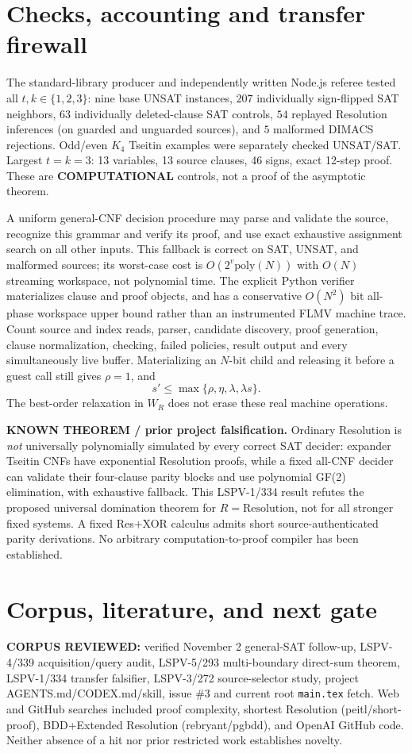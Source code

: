 \documentclass[11pt]{article}
\begin{document}
\section{Checks, accounting and transfer firewall}
The standard-library producer and independently written Node.js referee tested all $t,k\in\{1,2,3\}$: nine base UNSAT instances, $207$ individually sign-flipped SAT neighbors, $63$ individually deleted-clause SAT controls, $54$ replayed Resolution inferences (on guarded and unguarded sources), and $5$ malformed DIMACS rejections. Odd/even $K_4$ Tseitin examples were separately checked UNSAT/SAT. Largest $t=k=3$: 13 variables, 13 source clauses, 46 signs, exact 12-step proof. These are \textbf{COMPUTATIONAL} controls, not a proof of the asymptotic theorem.

A uniform general-CNF decision procedure may parse and validate the source, recognize this grammar and verify its proof, and use exact exhaustive assignment search on all other inputs. This fallback is correct on SAT, UNSAT, and malformed sources; its worst-case cost is $O(2^v\mathrm{poly}(N))$ with $O(N)$ streaming workspace, not polynomial time. The explicit Python verifier materializes clause and proof objects, and has a conservative $O(N^2)$ bit all-phase workspace upper bound rather than an instrumented FLMV machine trace. Count source and index reads, parser, candidate discovery, proof generation, clause normalization, checking, failed policies, result output and every simultaneously live buffer. Materializing an $N$-bit child and releasing it before a guest call still gives $\rho=1$, and
\[
s'\le\max\{\rho,\eta,\lambda,\lambda s\}.
\]
The best-order relaxation in $W_R$ does not erase these real machine operations.

\textbf{KNOWN THEOREM / prior project falsification.} Ordinary Resolution is \emph{not} universally polynomially simulated by every correct SAT decider: expander Tseitin CNFs have exponential Resolution proofs, while a fixed all-CNF decider can validate their four-clause parity blocks and use polynomial GF(2) elimination, with exhaustive fallback. This LSPV-1/334 result refutes the proposed universal domination theorem for $R=\mathrm{Resolution}$, not for all stronger fixed systems. A fixed Res+XOR calculus admits short source-authenticated parity derivations. No arbitrary computation-to-proof compiler has been established.

\section{Corpus, literature, and next gate}
\noindent\textbf{CORPUS REVIEWED:} verified November 2 general-SAT follow-up, LSPV-4/339 acquisition/query audit, LSPV-5/293 multi-boundary direct-sum theorem, LSPV-1/334 transfer falsifier, LSPV-3/272 source-selector study, project AGENTS.md/CODEX.md/skill, issue \#3 and current root \texttt{main.tex} fetch. Web and GitHub searches included proof complexity, shortest Resolution (peitl/short-proof), BDD+Extended Resolution (rebryant/pgbdd), and OpenAI GitHub code. Neither absence of a hit nor prior restricted work establishes novelty.
\end{document}
